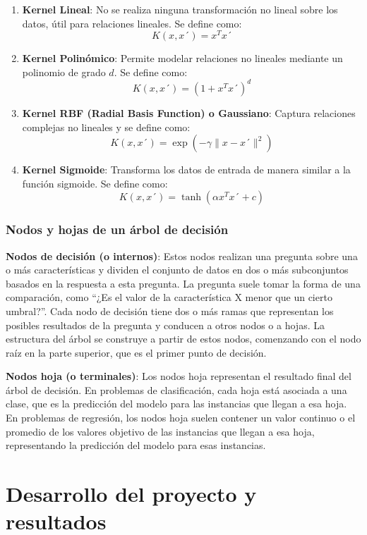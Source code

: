 \documentclass[
  11pt,
  bookmarksnumbered]{article}
\begin{document}
\begin{enumerate}
\def\labelenumi{\arabic{enumi}.}
\item
  \textbf{Kernel Lineal}: No se realiza ninguna transformación no lineal sobre los datos, útil para relaciones lineales.
  Se define como: \[K(x, x´) = x^T x´\]
\item
  \textbf{Kernel Polinómico}: Permite modelar relaciones no lineales mediante un polinomio de grado \(d\).
  Se define como: \[K(x, x´) = (1 + x^T x´)^d\]
\item
  \textbf{Kernel RBF (Radial Basis Function) o Gaussiano}: Captura relaciones complejas no lineales y se define como: \[K(x, x´) = \exp(-\gamma \|x - x´\|^2)\]
\item
  \textbf{Kernel Sigmoide}: Transforma los datos de entrada de manera similar a la función sigmoide.
  Se define como: \[K(x, x´) = \tanh(\alpha x^T x´ + c)\]
\end{enumerate}

\hypertarget{nodos-y-hojas-de-un-uxe1rbol-de-decisiuxf3n}{%
\subsubsection{Nodos y hojas de un árbol de decisión}\label{nodos-y-hojas-de-un-uxe1rbol-de-decisiuxf3n}}

\textbf{Nodos de decisión (o internos)}: Estos nodos realizan una pregunta sobre una o más características y dividen el conjunto de datos en dos o más subconjuntos basados en la respuesta a esta pregunta.
La pregunta suele tomar la forma de una comparación, como ``¿Es el valor de la característica X menor que un cierto umbral?''.
Cada nodo de decisión tiene dos o más ramas que representan los posibles resultados de la pregunta y conducen a otros nodos o a hojas.
La estructura del árbol se construye a partir de estos nodos, comenzando con el nodo raíz en la parte superior, que es el primer punto de decisión.

\textbf{Nodos hoja (o terminales)}: Los nodos hoja representan el resultado final del árbol de decisión.
En problemas de clasificación, cada hoja está asociada a una clase, que es la predicción del modelo para las instancias que llegan a esa hoja.
En problemas de regresión, los nodos hoja suelen contener un valor continuo o el promedio de los valores objetivo de las instancias que llegan a esa hoja, representando la predicción del modelo para esas instancias.

\newpage

\hypertarget{desarrollo-del-proyecto-y-resultados}{%
\section{Desarrollo del proyecto y resultados}\label{desarrollo-del-proyecto-y-resultados}}
\end{document}

